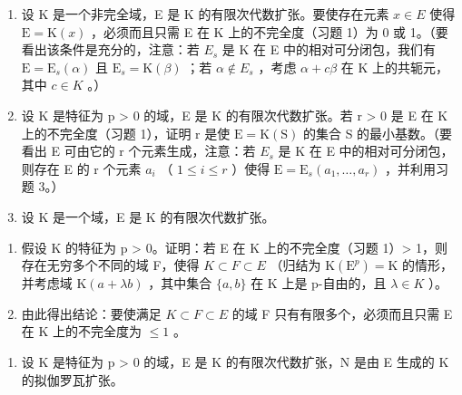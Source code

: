 \begin{enumerate}
\def\labelenumi{\arabic{enumi})}
\setcounter{enumi}{2}
\item
  设 K 是一个非完全域，E 是 K 的有限次代数扩张。要使存在元素 \(x \in E\) 使得 \(\mathrm{E} = \mathrm{K}(x)\) ，必须而且只需 E 在 K 上的不完全度（习题 1）为 0 或 1。（要看出该条件是充分的，注意：若 \(E_{s}\) 是 K 在 E 中的相对可分闭包，我们有 \(\mathrm{E} = \mathrm{E}_{s}(\alpha)\) 且 \(\mathrm{E}_{s} = \mathrm{K}(\beta)\) ；若 \(\alpha \notin E_{s}\) ，考虑 \(\alpha + c\beta\) 在 K 上的共轭元，其中 \(c \in K\) 。）
\item
  设 K 是特征为 p \textgreater{} 0 的域，E 是 K 的有限次代数扩张。若 r \textgreater{} 0 是 E 在 K 上的不完全度（习题 1），证明 r 是使 \(\mathrm{E} = \mathrm{K}(\mathrm{S})\) 的集合 S 的最小基数。（要看出 E 可由它的 r 个元素生成，注意：若 \(E_{s}\) 是 K 在 E 中的相对可分闭包，则存在 E 的 r 个元素 \(a_{i}\) （ \(1 \leqslant i \leqslant r\) ）使得 \(\mathrm{E} = \mathrm{E}_{s}(a_{1}, \ldots, a_{r})\) ，并利用习题 3。）
\item
  设 K 是一个域，E 是 K 的有限次代数扩张。
\end{enumerate}

\begin{enumerate}
\def\labelenumi{\alph{enumi})}
\item
  假设 K 的特征为 p \textgreater{} 0。证明：若 E 在 K 上的不完全度（习题 1）\textgreater{} 1，则存在无穷多个不同的域 F，使得 \(K \subset F \subset E\) （归结为 \(\mathrm{K}(\mathrm{E}^{p}) = \mathrm{K}\) 的情形，并考虑域 \(\mathrm{K}(a + \lambda b)\) ，其中集合 \(\{a, b\}\) 在 K 上是 p-自由的，且 \(\lambda \in K\) ）。
\item
  由此得出结论：要使满足 \(K \subset F \subset E\) 的域 F 只有有限多个，必须而且只需 E 在 K 上的不完全度为 \(\leqslant 1\) 。
\end{enumerate}

\begin{enumerate}
\def\labelenumi{\arabic{enumi})}
\setcounter{enumi}{5}
\tightlist
\item
  设 K 是特征为 p \textgreater{} 0 的域，E 是 K 的有限次代数扩张，N 是由 E 生成的 K 的拟伽罗瓦扩张。
\end{enumerate}

